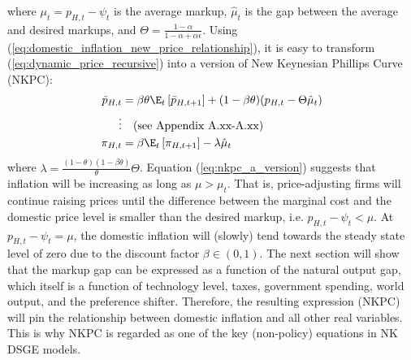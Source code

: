 where $\mu_t = p_{H,t} - \psi_t$ is the average markup, $\hat{\mu}_t$ is the gap between the average and desired markups, and $\Theta = \frac{1-\alpha}{1-\alpha + \alpha \epsilon}$. Using (\ref{eq:domestic_inflation_new_price_relationship}), it is easy to transform (\ref{eq:dynamic_price_recursive}) into a version of New Keynesian Phillips Curve (NKPC):
\begin{align}
    \bar{p}_{H,t} &= \beta \theta \E_t \left[ \bar{p}_{H,t+1} \right] + (1-\beta \theta)(p_{H,t} - \Theta \hat{\mu}_t) \\
    \vdots & \quad \text{(see Appendix A.xx-A.xx)} \nonumber \\
    \pi_{H,t} &= \beta \E_t \left[ \pi_{H,t+1}\right] - \lambda \hat{\mu}_t \label{eq:nkpc_a_version}
\end{align}
where $\lambda = \frac{(1-\theta)(1-\beta \theta)}{\theta}\Theta$. Equation (\ref{eq:nkpc_a_version}) suggests that inflation will be increasing as long as $\mu > \mu_t$. That is, price-adjusting firms will continue raising prices until the difference between the marginal cost and the domestic price level is smaller than the desired markup, i.e. $p_{H,t} - \psi_t < \mu$. At $p_{H,t} - \psi_t = \mu$, the domestic inflation will (slowly) tend towards the steady state level of zero due to the discount factor $\beta \in (0,1)$. The next section will show that the markup gap can be expressed as a function of the natural output gap, which itself is a function of technology level, taxes, government spending, world output, and the preference shifter. Therefore, the resulting expression (NKPC) will pin the relationship between domestic inflation and all other real variables. This is why NKPC is regarded as one of the key (non-policy) equations in NK DSGE models.